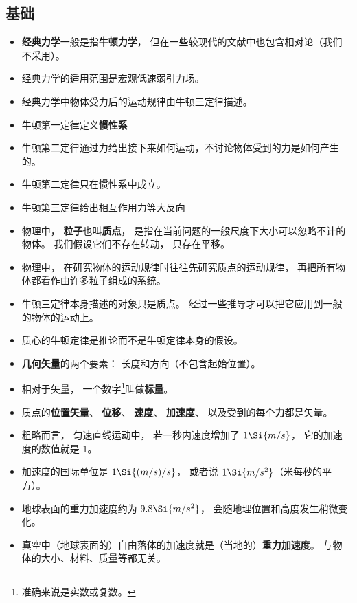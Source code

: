 
\begin{issues}
\issueDraft
\end{issues}

\subsection{基础}
\begin{itemize}
\item \textbf{经典力学}一般是指\textbf{牛顿力学}， 但在一些较现代的文献中也包含相对论（我们不采用）。
\item 经典力学的适用范围是宏观低速弱引力场。
\item 经典力学中物体受力后的运动规律由牛顿三定律描述。
\item 牛顿第一定律定义\textbf{惯性系}
\item 牛顿第二定律通过力给出接下来如何运动，不讨论物体受到的力是如何产生的。
\item 牛顿第二定律只在惯性系中成立。
\item 牛顿第三定律给出相互作用力等大反向
\item 物理中， \textbf{粒子}也叫\textbf{质点}， 是指在当前问题的一般尺度下大小可以忽略不计的物体。 我们假设它们不存在转动， 只存在平移。
\item 物理中， 在研究物体的运动规律时往往先研究质点的运动规律， 再把所有物体都看作由许多粒子组成的系统。
\item 牛顿三定律本身描述的对象只是质点。 经过一些推导才可以把它应用到一般的物体的运动上。
\item 质心的牛顿定律是推论而不是牛顿定律本身的假设。
\item \textbf{几何矢量}的两个要素： 长度和方向（不包含起始位置）。
\item 相对于矢量， 一个数字\footnote{准确来说是实数或复数。}叫做\textbf{标量}。
\item 质点的\textbf{位置矢量}、 \textbf{位移}、 \textbf{速度}、 \textbf{加速度}、 以及受到的每个\textbf{力}都是矢量。
\item 粗略而言， 匀速直线运动中， 若一秒内速度增加了 $1\Si{m/s}$， 它的加速度的数值就是 $1$。
\item 加速度的国际单位是 $1\Si{(m/s)/s}$， 或者说 $1\Si{m/s^2}$（米每秒的平方）。
\item 地球表面的重力加速度约为 $9.8\Si{m/s^2}$， 会随地理位置和高度发生稍微变化。
\item 真空中（地球表面的）自由落体的加速度就是（当地的）\textbf{重力加速度}。 与物体的大小、材料、质量等都无关。

\end{itemize}
